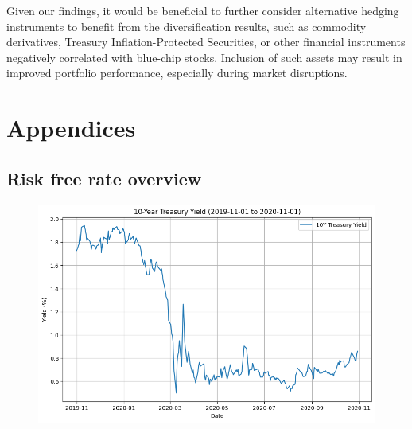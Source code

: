\documentclass[a4paper,12pt]{article}
\begin{document}
Given our findings, it would be beneficial to further consider alternative hedging instruments to benefit from the diversification results, such as commodity derivatives, Treasury Inflation-Protected Securities, or other financial instruments negatively correlated with blue-chip stocks. Inclusion of such assets may result in improved portfolio performance, especially during market disruptions. 


\newpage



\clearpage

\section{Appendices}
\subsection{Risk free rate overview \label{yield}}
\begin{figure}[htbp]
    \centering
    \includegraphics[width=1\textwidth]{resources/10-Year Treasury Yield.png}
\end{figure}
\newpage
\end{document}
